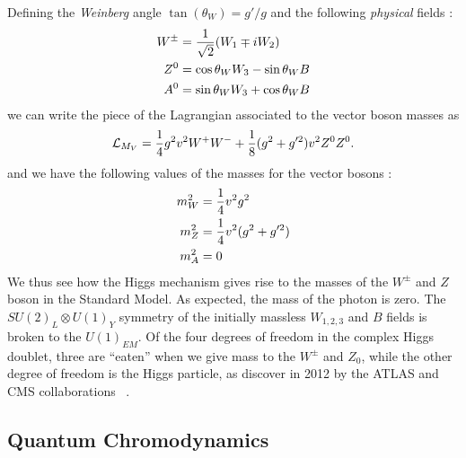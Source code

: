 Defining the \textit{Weinberg} angle $\tan(\theta_W) = g'/g$ and the following \textit{physical} fields :
\begin{align}
W^{\pm} &= \frac{1}{\sqrt{2}}(W_1 \mp iW_2) \\
Z^0 &= \cos \theta_W W_3 - \sin\theta_W B \notag\\
A^0 &= \sin \theta_W W_3 + \cos\theta_W B \notag
\end{align}
we can write the piece of the Lagrangian associated to the vector boson masses as
\begin{equation}
\mathcal{L}_{M_V} = \frac{1}{4} g^2 v^2 W^+ W^- + \frac{1}{8} (g^2 + g'^2)v^2 Z^0 Z^0 .
\end{equation}
and we have the following values of the masses for the vector bosons :
\begin{align}
m_W^2 &= \frac{1}{4}  v^2 g^2  \\
m_Z^2 &= \frac{1}{4}  v^2 (g^2 + g'^2)  \notag \\
m_A^2 &= 0  \notag
\end{align}
We thus see how the Higgs mechanism gives rise to the masses of the $W^{\pm}$ and $Z$ boson in the Standard Model.
As expected, the mass of the photon is zero.
The $SU(2)_L \otimes U(1)_Y$ symmetry of the initially massless $W_{1,2,3}$ and $B$ fields is broken to the $U(1)_{EM}$.
Of the four degrees of freedom in the complex Higgs doublet, three are ``eaten'' when we give mass to the $W^\pm$ and $Z_0$, while the other degree of freedom is the Higgs particle, as discover in 2012 by the ATLAS and CMS collaborations ~\cite{HIGG-2012-27, CMS-HIG-12-028}.

\subsection{Quantum Chromodynamics}

